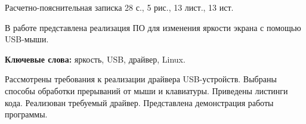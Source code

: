 Расчетно-пояснительная записка 28 с., 5 рис., 13 лист., 13 ист.

В работе представлена реализация ПО для изменения яркости экрана с помощью USB-мыши.

\textbf{Ключевые слова:} яркость, USB, драйвер, Linux.

Рассмотрены требования к реализации драйвера USB-устройств.
Выбраны способы обработки прерываний от мыши и клавиатуры.
Приведены листинги кода.
Реализован требуемый драйвер.
Представлена демонстрация работы программы.